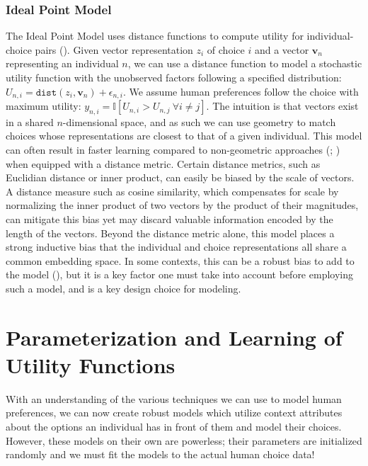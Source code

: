 \documentclass[
  letterpaper,
  numbers=noenddot,
  DIV=11]{scrreprt}
\theoremstyle{definition}
\theoremstyle{plain}
\theoremstyle{plain}
\theoremstyle{remark}
\begin{document}
\subsubsection*{Ideal Point Model}\label{ideal-point-model}

The Ideal Point Model uses distance functions to compute utility for
individual-choice pairs ().
Given vector representation \(z_i\) of choice \(i\) and a vector
\(\textbf{v}_n\) representing an individual \(n\), we can use a distance
function to model a stochastic utility function with the unobserved
factors following a specified distribution:
\(U_{n, i} = \texttt{dist}(z_i, \textbf{v}_n) + \epsilon_{n, i}\). We
assume human preferences follow the choice with maximum utility:
\(y_{n, i} = \mathbb{I}[U_{n, i} > U_{n, j} \ \forall i \ne j]\). The
intuition is that vectors exist in a shared \(n\)-dimensional space, and
as such we can use geometry to match choices whose representations are
closest to that of a given individual. This model can often result in
faster learning compared to non-geometric approaches
(;
) when equipped with a distance metric. Certain distance metrics,
such as Euclidian distance or inner product, can easily be biased by the
scale of vectors. A distance measure such as cosine similarity, which
compensates for scale by normalizing the inner product of two vectors by
the product of their magnitudes, can mitigate this bias yet may discard
valuable information encoded by the length of the vectors. Beyond the
distance metric alone, this model places a strong inductive bias that
the individual and choice representations all share a common embedding
space. In some contexts, this can be a robust bias to add to the model
(), but it is a key factor one
must take into account before employing such a model, and is a key
design choice for modeling.

\section{Parameterization and Learning of Utility
Functions}\label{sec-learning}

With an understanding of the various techniques we can use to model
human preferences, we can now create robust models which utilize context
attributes about the options an individual has in front of them and
model their choices. However, these models on their own are powerless;
their parameters are initialized randomly and we must fit the models to
the actual human choice data!
\end{document}

